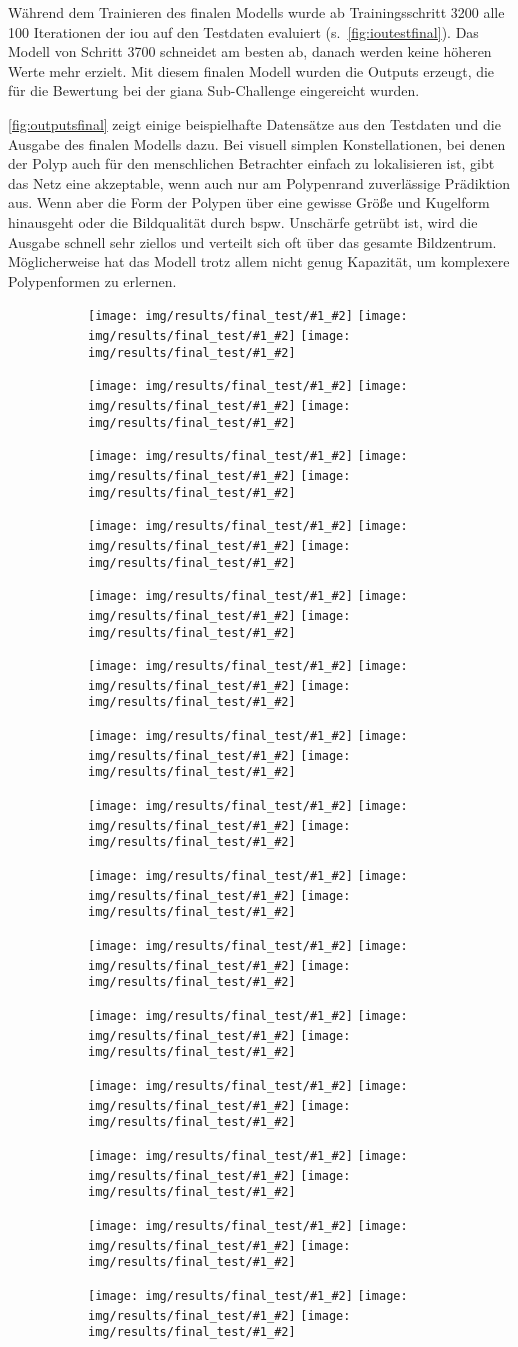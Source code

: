 
Während dem Trainieren des finalen Modells wurde ab Trainingsschritt 3200 alle 100 Iterationen der \gls{iou} auf den Testdaten evaluiert (s.~\autoref{fig:ioutestfinal}).
Das Modell von Schritt 3700 schneidet am besten ab, danach werden keine höheren Werte mehr erzielt.
Mit diesem finalen Modell wurden die Outputs erzeugt, die für die Bewertung bei der \gls{giana} Sub-Challenge eingereicht wurden.


\autoref{fig:outputsfinal} zeigt einige beispielhafte Datensätze aus den Testdaten und die Ausgabe des finalen Modells dazu.
Bei visuell simplen Konstellationen, bei denen der Polyp auch für den menschlichen Betrachter einfach zu lokalisieren ist, gibt das Netz eine akzeptable, wenn auch nur am Polypenrand zuverlässige Prädiktion aus.
Wenn aber die Form der Polypen über eine gewisse Größe und Kugelform hinausgeht oder die Bildqualität durch bspw. Unschärfe getrübt ist, wird die Ausgabe schnell sehr ziellos und verteilt sich oft über das gesamte Bildzentrum.
Möglicherweise hat das Modell trotz allem nicht genug Kapazität, um komplexere Polypenformen zu erlernen.

\newcommand{\figureOutput}[2]{\texttt{[image: img/results/final\_test/\#1\_\#2]}}
\newcommand{\figureSample}[1]{
	\begin{subfigure}{\linewidth}
		\centering
		\figureOutput{#1}{input}
		\figureOutput{#1}{target}
		\figureOutput{#1}{output}
		\vspace*{2mm}
	\end{subfigure}
}
\begin{sidewaysfigure}
	\centering
	\begin{subfigure}{.31\textwidth}
		\centering
		\figureSample{117}
		\figureSample{128}
		\figureSample{139}
		\figureSample{150}
		\figureSample{161}
	\end{subfigure}
	\begin{subfigure}{.31\textwidth}
		\centering
		\figureSample{118}
		\figureSample{129}
		\figureSample{140}
		\figureSample{151}
		\figureSample{162}
	\end{subfigure}
	\begin{subfigure}{.31\textwidth}
		\centering
		\figureSample{119}
		\figureSample{130}
		\figureSample{141}
		\figureSample{152}
		\figureSample{163}
	\end{subfigure}
	\caption{Beispielhafte Datensätze der Testdaten und Ausgaben des finalen Modells (Input, Target, Output)}
	\label{fig:outputsfinal}
\end{sidewaysfigure}



